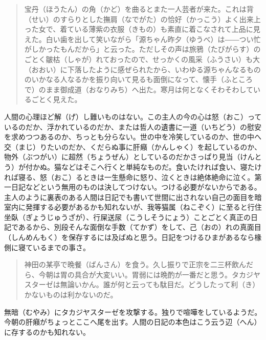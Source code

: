 \documentclass{book}
\begin{document}
\blockquote{宝丹（ほうたん）の角（かど）を曲るとまた一人芸者が来た。これは背（せい）のすらりとした撫肩（なでがた）の恰好（かっこう）よく出来上った女で、着ている薄紫の衣服（きもの）も素直に着こなされて上品に見えた。白い歯を出して笑いながら「源ちゃん昨夕（ゆうべ）は――つい忙がしかったもんだから」と云った。ただしその声は旅鴉（たびがらす）のごとく皺枯（しゃが）れておったので、せっかくの風采（ふうさい）も大（おおい）に下落したように感ぜられたから、いわゆる源ちゃんなるもののいかなる人なるかを振り向いて見るも面倒になって、懐手（ふところで）のまま御成道（おなりみち）へ出た。寒月は何となくそわそわしているごとく見えた。}

人間の心理ほど解（げ）し難いものはない。この主人の今の心は怒（おこ）っているのだか、浮かれているのだか、または哲人の遺書に一道（いちどう）の慰安を求めつつあるのか、ちっとも分らない。世の中を冷笑しているのか、世の中へ交（まじ）りたいのだか、くだらぬ事に肝癪（かんしゃく）を起しているのか、物外（ぶつがい）に超然（ちょうぜん）としているのだかさっぱり見当（けんとう）が付かぬ。猫などはそこへ行くと単純なものだ。食いたければ食い、寝たければ寝る、怒（おこ）るときは一生懸命に怒り、泣くときは絶体絶命に泣く。第一日記などという無用のものは決してつけない。つける必要がないからである。主人のように裏表のある人間は日記でも書いて世間に出されない自己の面目を暗室内に発揮する必要があるかも知れないが、我等猫属（ねこぞく）に至ると行住坐臥（ぎょうじゅうざが）、行屎送尿（こうしそうにょう）ことごとく真正の日記であるから、別段そんな面倒な手数（てかず）をして、己（おの）れの真面目（しんめんもく）を保存するには及ばぬと思う。日記をつけるひまがあるなら椽側に寝ているまでの事さ。

\blockquote{神田の某亭で晩餐（ばんさん）を食う。久し振りで正宗を二三杯飲んだら、今朝は胃の具合が大変いい。胃弱には晩酌が一番だと思う。タカジヤスターゼは無論いかん。誰が何と云っても駄目だ。どうしたって利（き）かないものは利かないのだ。}

無暗（むやみ）にタカジヤスターゼを攻撃する。独りで喧嘩をしているようだ。今朝の肝癪がちょっとここへ尾を出す。人間の日記の本色はこう云う辺（へん）に存するのかも知れない。
\end{document}

